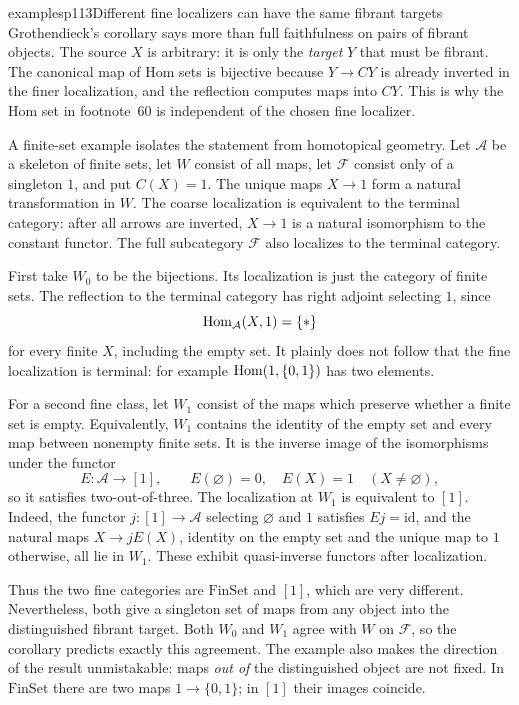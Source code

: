 \begin{dcomment}{examples}{p113}{Different fine localizers can have the same fibrant targets}
Grothendieck's corollary says more than full faithfulness on pairs of fibrant objects. The source $X$ is arbitrary: it is only the \emph{target} $Y$ that must be fibrant. The canonical map of Hom sets is bijective because $Y\to CY$ is already inverted in the finer localization, and the reflection computes maps into $CY$. This is why the Hom set in footnote~60 is independent of the chosen fine localizer.

A finite-set example isolates the statement from homotopical geometry. Let $\mathcal A$ be a skeleton of finite sets, let $W$ consist of all maps, let $\mathcal F$ consist only of a singleton $1$, and put $C(X)=1$. The unique maps $X\to1$ form a natural transformation in $W$. The coarse localization is equivalent to the terminal category: after all arrows are inverted, $X\to1$ is a natural isomorphism to the constant functor. The full subcategory $\mathcal F$ also localizes to the terminal category.

First take $W_0$ to be the bijections. Its localization is just the category of finite sets. The reflection to the terminal category has right adjoint selecting $1$, since
\[
 \operatorname{Hom}_{\mathcal A}(X,1)=\{*\}
\]
for every finite $X$, including the empty set. It plainly does not follow that the fine localization is terminal: for example $\operatorname{Hom}(1,\{0,1\})$ has two elements.

For a second fine class, let $W_1$ consist of the maps which preserve whether a finite set is empty. Equivalently, $W_1$ contains the identity of the empty set and every map between nonempty finite sets. It is the inverse image of the isomorphisms under the functor
\[
 E:\mathcal A\to[1],\qquad
 E(\varnothing)=0,\quad E(X)=1\quad(X\ne\varnothing),
\]
so it satisfies two-out-of-three. The localization at $W_1$ is equivalent to $[1]$. Indeed, the functor $j:[1]\to\mathcal A$ selecting $\varnothing$ and $1$ satisfies $Ej=\mathrm{id}$, and the natural maps $X\to jE(X)$, identity on the empty set and the unique map to $1$ otherwise, all lie in $W_1$. These exhibit quasi-inverse functors after localization.

Thus the two fine categories are $\mathrm{FinSet}$ and $[1]$, which are very different. Nevertheless, both give a singleton set of maps from any object into the distinguished fibrant target. Both $W_0$ and $W_1$ agree with $W$ on $\mathcal F$, so the corollary predicts exactly this agreement. The example also makes the direction of the result unmistakable: maps \emph{out of} the distinguished object are not fixed. In $\mathrm{FinSet}$ there are two maps $1\to\{0,1\}$; in $[1]$ their images coincide.
\end{dcomment}


